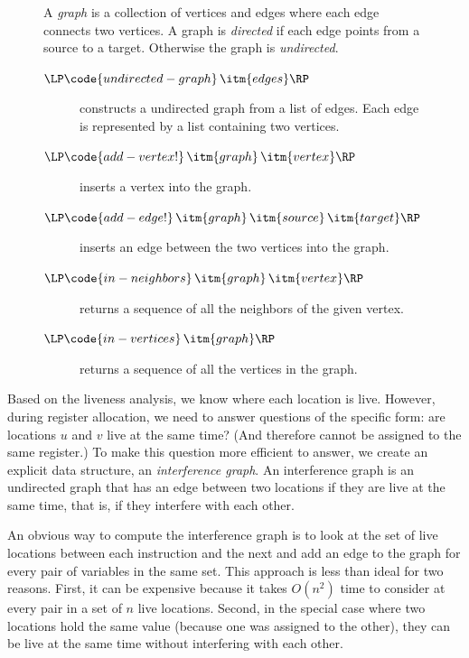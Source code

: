 \documentclass[11pt]{book}
\begin{document}
\begin{figure}
  \small
  \begin{tcolorbox}[title=\href{https://docs.racket-lang.org/graph/index.html}{The Racket Graph Library}]
    A \emph{graph} is a collection of vertices and edges where each
    edge connects two vertices.  A graph is \emph{directed} if each
    edge points from a source to a target.  Otherwise the graph is
    \emph{undirected}.
  \begin{description}
  \item[$\LP\code{undirected-graph}\,\itm{edges}\RP$] constructs a
    undirected graph from a list of edges. Each edge is represented by
    a list containing two vertices.
  \item[$\LP\code{add-vertex!}\,\itm{graph}\,\itm{vertex}\RP$]
    inserts a vertex into the graph.
  \item[$\LP\code{add-edge!}\,\itm{graph}\,\itm{source}\,\itm{target}\RP$]
    inserts an edge between the two vertices into the graph.
  \item[$\LP\code{in-neighbors}\,\itm{graph}\,\itm{vertex}\RP$]
    returns a sequence of all the neighbors of the given vertex.
  \item[$\LP\code{in-vertices}\,\itm{graph}\RP$]
    returns a sequence of all the vertices in the graph.
  \end{description}
\end{tcolorbox}
\end{figure}

Based on the liveness analysis, we know where each location is live.
However, during register allocation, we need to answer questions of
the specific form: are locations $u$ and $v$ live at the same time?
(And therefore cannot be assigned to the same register.)  To make this
question more efficient to answer, we create an explicit data
structure, an \emph{interference graph}.  An
interference graph is an undirected graph that has an edge between two
locations if they are live at the same time, that is, if they
interfere with each other.

An obvious way to compute the interference graph is to look at the set
of live locations between each instruction and the next and add an edge to the graph
for every pair of variables in the same set.  This approach is less
than ideal for two reasons. First, it can be expensive because it
takes $O(n^2)$ time to consider at every pair in a set of $n$ live
locations. Second, in the special case where two locations hold the
same value (because one was assigned to the other), they can be live
at the same time without interfering with each other.
\end{document}
